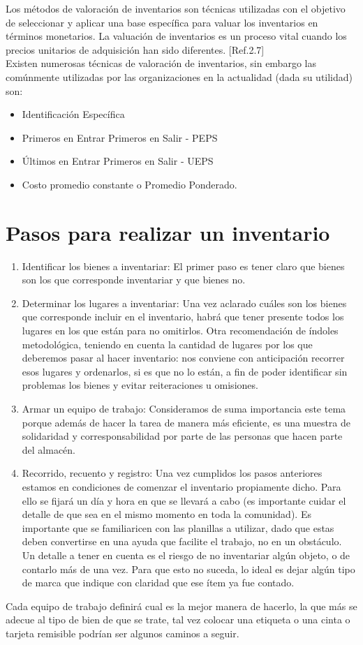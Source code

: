 Los métodos de valoración de inventarios son técnicas utilizadas con el objetivo de seleccionar y aplicar una base específica para valuar los inventarios en términos monetarios. La valuación de inventarios es un proceso vital cuando los precios unitarios de adquisición han sido diferentes. [Ref.2.7]\\

Existen numerosas técnicas de valoración de inventarios, sin embargo las comúnmente utilizadas por las organizaciones en la actualidad (dada su utilidad) son:

\begin{itemize}
\item Identificación Específica 
\item Primeros en Entrar Primeros en Salir - PEPS
\item Últimos en Entrar Primeros en Salir - UEPS
\item Costo promedio constante o Promedio Ponderado.
\end{itemize}
\section{Pasos para realizar un inventario}
\begin{enumerate}
\item Identificar los bienes a inventariar: El primer paso es tener claro que bienes son los que corresponde inventariar y que bienes no.
\item Determinar los lugares a inventariar: Una vez aclarado cuáles son los bienes que corresponde incluir en el inventario, habrá que tener presente todos los lugares en los que están para no omitirlos. Otra recomendación de índoles metodológica, teniendo en cuenta la cantidad de lugares por los que deberemos pasar al hacer inventario: nos conviene con anticipación recorrer esos lugares y ordenarlos, si es que no lo están, a fin de poder identificar sin problemas los bienes y evitar reiteraciones u omisiones.
\item Armar un equipo de trabajo: Consideramos de suma importancia este tema porque además de hacer la tarea de manera más eficiente, es una muestra de solidaridad y corresponsabilidad por parte de las personas que hacen parte del almacén.
\item Recorrido, recuento y registro: Una vez cumplidos los pasos anteriores estamos en condiciones de comenzar el inventario propiamente dicho. Para ello se fijará un día y hora en que se llevará a cabo (es importante cuidar el detalle de que sea en el mismo momento en toda la comunidad). Es importante que se familiaricen con las planillas a utilizar, dado que estas deben convertirse en una ayuda que facilite el trabajo, no en un obstáculo. Un detalle a tener en cuenta es el riesgo de no inventariar algún objeto, o de contarlo más de una vez. Para que esto no suceda, lo ideal es dejar algún tipo de marca que indique con claridad que ese ítem ya fue contado.
\end{enumerate}

Cada equipo de trabajo definirá cual es la mejor manera de hacerlo, la que más se adecue al tipo de bien de que se trate, tal vez colocar una etiqueta o una cinta o tarjeta remisible podrían ser algunos caminos a seguir.\\